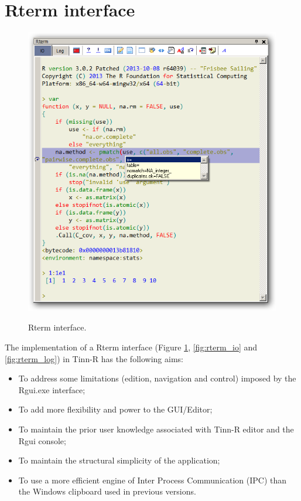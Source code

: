
\hypertarget{working_rterm}{}
\section{Rterm interface}

\begin{figure}[h!]
  \includegraphics[scale=0.35]{./res/rterm.png}\\
  \caption{Rterm interface.}
  \label{fig:rterm_interface}
\end{figure}

The implementation of a Rterm interface
(Figure \ref{fig:rterm_interface},
\ref{fig:rterm_io} and
\ref{fig:rterm_log})
in Tinn-R has the following aims:
\begin{itemize}
  \item To address some limitations (edition, navigation and control) imposed by the Rgui.exe interface;
  \item To add more flexibility and power to the GUI/Editor;
  \item To maintain the prior user knowledge associated with Tinn-R editor and the Rgui console;
  \item To maintain the structural simplicity of the application;
  \item To use a more efficient engine of Inter Process Communication (IPC)
    than the Windows clipboard used in previous versions.
\end{itemize}

